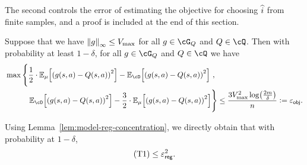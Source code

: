 The second controls the error of estimating the objective for choosing $\ihat$ 
from finite samples, and a proof is included at the end of this section. 
\begin{lemma}\label{lem:model-obj-concentration}
  Suppose that we have $\nbr*{g}_\infty \le \Vmax$ 
  for all $g\in\cG_{Q}$ and $Q \in \cQ$.
  Then with probability at least $1-\delta$, 
  for all $g\in\cG_{Q}$ and $Q \in \cQ$ we have 
  \begin{align}
    &\max\Bigg\{
      \frac{1}{2}\cdot \En_{\data}\sbr*{\rbr*{g(s,a) - Q(s,a)}^2 } - \En_{\cD}\sbr*{\rbr*{g(s,a) - Q(s,a)}^2}~,
      \\
      & \qquad\quad\En_{\cD}\sbr*{\rbr*{g(s,a) - Q(s,a)}^2 } - \frac{3}{2} \cdot\En_{\data}\sbr*{\rbr*{g(s,a) - Q(s,a)}^2}
    \Bigg\}
     \le \frac{3\Vmax^2\log\rbr*{\frac{2m}{\delta}}}{n} \ldef{} \vepsobj.
  \end{align}
\end{lemma}

%
%
%
%
%
%
%
Using Lemma~\ref{lem:model-reg-concentration}, we directly obtain that with probability at $1-\delta$,
\begin{align}
  \mathrm{(T 1)} \le \vepssqs.
\end{align}

